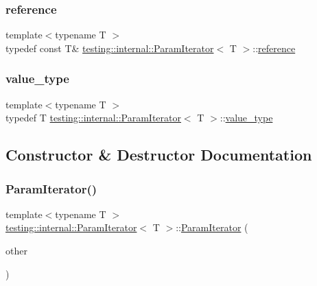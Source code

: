 \subsubsection{\texorpdfstring{reference}{reference}}
{\footnotesize\ttfamily template$<$typename T $>$ \\
typedef const T\& \hyperlink{classtesting_1_1internal_1_1ParamIterator}{testing\+::internal\+::\+Param\+Iterator}$<$ T $>$\+::\hyperlink{classtesting_1_1internal_1_1ParamIterator_ac96f133ffa06fc0f9faff5a1c7954382}{reference}}

\mbox{\label{classtesting_1_1internal_1_1ParamIterator_a4afe3a68db0d0744753c8afe262e35df}} 
\subsubsection{\texorpdfstring{value\+\_\+type}{value\_type}}
{\footnotesize\ttfamily template$<$typename T $>$ \\
typedef T \hyperlink{classtesting_1_1internal_1_1ParamIterator}{testing\+::internal\+::\+Param\+Iterator}$<$ T $>$\+::\hyperlink{classtesting_1_1internal_1_1ParamIterator_a4afe3a68db0d0744753c8afe262e35df}{value\+\_\+type}}



\subsection{Constructor \& Destructor Documentation}
\mbox{\label{classtesting_1_1internal_1_1ParamIterator_aa10585055ee055e304703a3004f24f33}} 
\subsubsection{\texorpdfstring{Param\+Iterator()}{ParamIterator()}\hspace{0.1cm}{\footnotesize\ttfamily [1/2]}}
{\footnotesize\ttfamily template$<$typename T $>$ \\
\hyperlink{classtesting_1_1internal_1_1ParamIterator}{testing\+::internal\+::\+Param\+Iterator}$<$ T $>$\+::\hyperlink{classtesting_1_1internal_1_1ParamIterator}{Param\+Iterator} (\begin{DoxyParamCaption}\item[{const \hyperlink{classtesting_1_1internal_1_1ParamIterator}{Param\+Iterator}$<$ T $>$ \&}]{other }\end{DoxyParamCaption})\hspace{0.3cm}{\ttfamily [inline]}}

